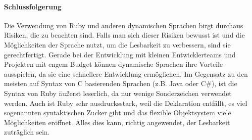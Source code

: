 %
%
%





\paragraph{Schlussfolgerung}
Die Verwendung von Ruby und anderen dynamischen Sprachen birgt durchaus Risiken, die zu beachten sind. Falls man sich dieser Risiken bewusst ist und die Möglichkeiten der Sprache nutzt, um die Lesbarkeit zu verbessern, sind sie gerechtfertigt. Gerade bei der Entwicklung mit kleinen Entwicklerteams und Projekten mit engem Budget können dynamische Sprachen ihre Vorteile ausspielen, da sie eine schnellere Entwicklung ermöglichen. Im Gegensatz zu den meisten auf Syntax von C basierenden Sprachen (z.B. Java oder C\#), ist die Syntax von Ruby äußerst leserlich, da nur wenige Sonderzeichen verwendet werden. Auch ist Ruby sehr ausdrucksstark, weil die Deklaration entfällt, es viel sogenannten syntaktischen Zucker gibt und das flexible Objektsystem viele Möglichkeiten eröffnet. Alles dies kann, richtig angewendet, der Lesbarkeit zuträglich sein.


